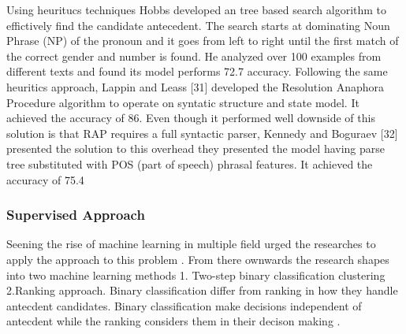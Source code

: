 \documentclass[11pt]{article}
\begin{document}
Using  heuritucs techniques Hobbs developed an  tree based search algorithm to effictively find the candidate antecedent. The search starts at dominating Noun Phrase (NP) of the pronoun and it goes from left to right until the first match of the correct gender and number is found. He analyzed over 100 examples from different texts and found its model performs 72.7 accuracy. Following the same heuritics approach, Lappin and Leass [31] developed the Resolution Anaphora Procedure algorithm to operate on syntatic structure and state model. It achieved the accuracy of 86. Even though it performed well downside of this solution is that RAP requires a full syntactic parser, Kennedy and Boguraev [32] presented the solution to this overhead they presented the model having parse tree substituted with POS (part of speech) phrasal features. It achieved the accuracy of 75.4


\subsubsection{Supervised Approach}

Seening the rise of machine learning in multiple field urged the researches to apply the approach to this problem . From there ownwards the research shapes into two machine learning methods 1. Two-step binary classification clustering 2.Ranking approach. Binary classification differ from ranking in how they handle antecdent candidates. Binary classification make decisions independent of antecdent while the ranking considers them in their decison making .
\end{document}

